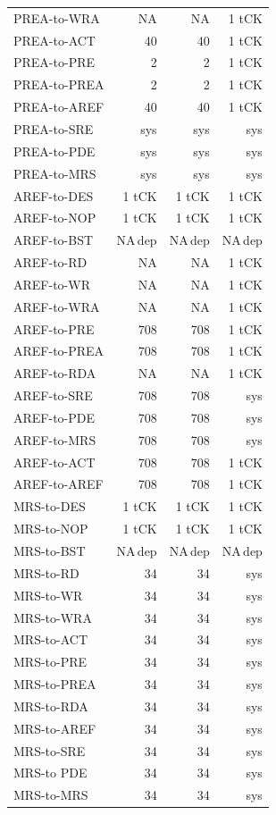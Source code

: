 {\begin{longtable}{@{}l r r r@{}}
PREA-to-WRA & NA & NA & 1 tCK\\
PREA-to-ACT & 40 & 40 & 1 tCK\\
PREA-to-PRE & 2 & 2 & 1 tCK\\
PREA-to-PREA & 2 & 2 & 1 tCK\\
PREA-to-AREF & 40 & 40 & 1 tCK\\
PREA-to-SRE & sys & sys & sys\\
PREA-to-PDE & sys & sys & sys\\
PREA-to-MRS & sys & sys & sys\\
AREF-to-DES & 1 tCK & 1 tCK & 1 tCK\\
AREF-to-NOP & 1 tCK & 1 tCK & 1 tCK\\
AREF-to-BST & NA\,dep & NA\,dep & NA\,dep\\
AREF-to-RD & NA & NA & 1 tCK\\
AREF-to-WR & NA & NA & 1 tCK\\
AREF-to-WRA & NA & NA & 1 tCK\\
AREF-to-PRE & 708 & 708 & 1 tCK\\
AREF-to-PREA & 708 & 708 & 1 tCK\\
AREF-to-RDA & NA & NA & 1 tCK\\
AREF-to-SRE & 708 & 708 & sys\\
AREF-to-PDE & 708 & 708 & sys\\
AREF-to-MRS & 708 & 708 & sys\\
AREF-to-ACT & 708 & 708 & 1 tCK\\
AREF-to-AREF & 708 & 708 & 1 tCK\\
MRS-to-DES & 1 tCK & 1 tCK & 1 tCK\\
MRS-to-NOP & 1 tCK & 1 tCK & 1 tCK\\
MRS-to-BST & NA\,dep & NA\,dep & NA\,dep\\
MRS-to-RD & 34 & 34 & sys\\
MRS-to-WR & 34 & 34 & sys\\
MRS-to-WRA & 34 & 34 & sys\\
MRS-to-ACT & 34 & 34 & sys\\
MRS-to-PRE & 34 & 34 & sys\\
MRS-to-PREA & 34 & 34 & sys\\
MRS-to-RDA & 34 & 34 & sys\\
MRS-to-AREF & 34 & 34 & sys\\
MRS-to-SRE & 34 & 34 & sys\\
MRS-to PDE & 34 & 34 & sys\\
MRS-to-MRS & 34 & 34 & sys\\

\end{longtable}}
